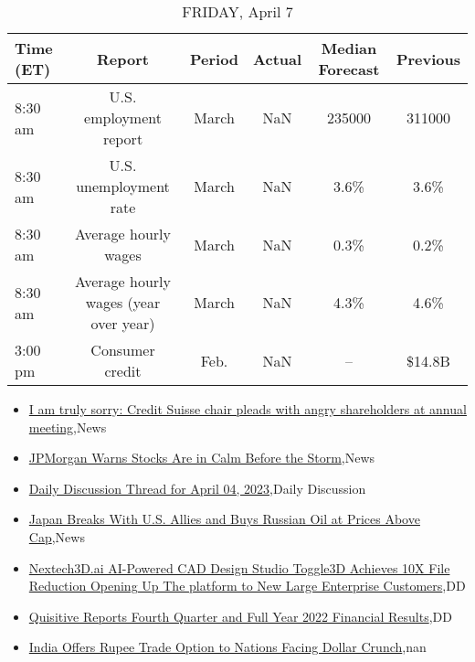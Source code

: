 \documentclass{article}%
\begin{document}
\begin{table}[htbp]%
\caption{FRIDAY, April 7}%
\centering%
\begin{adjustbox}{width=1\textwidth}%
\begin{tabular}{lccccc}
\toprule
Time (ET) &                                Report & Period & Actual & Median Forecast & Previous \\
\midrule
  8:30 am &                U.S. employment report &  March &    NaN &          235000 &   311000 \\
  8:30 am &                U.S. unemployment rate &  March &    NaN &            3.6\% &     3.6\% \\
  8:30 am &                  Average hourly wages &  March &    NaN &            0.3\% &     0.2\% \\
  8:30 am & Average hourly wages (year over year) &  March &    NaN &            4.3\% &     4.6\% \\
  3:00 pm &                       Consumer credit &   Feb. &    NaN &              -- &   \$14.8B \\
\bottomrule
\end{tabular}
%
\end{adjustbox}%
\end{table}

%
\begin{itemize}%
\item%
\href{https://reddit.com/r/wallstreetbets/comments/12bg1k6/i\_am\_truly\_sorry\_credit\_suisse\_chair\_pleads\_with/}{I am truly sorry: Credit Suisse chair pleads with angry shareholders at annual meeting},News%
\item%
\href{https://reddit.com/r/wallstreetbets/comments/12bfk59/jpmorgan\_warns\_stocks\_are\_in\_calm\_before\_the\_storm/}{JPMorgan Warns Stocks Are in Calm Before the Storm},News%
\item%
\href{https://reddit.com/r/wallstreetbets/comments/12be7jw/daily\_discussion\_thread\_for\_april\_04\_2023/}{Daily Discussion Thread for April 04, 2023},Daily Discussion%
\item%
\href{https://reddit.com/r/wallstreetbets/comments/12bddgr/japan\_breaks\_with\_us\_allies\_and\_buys\_russian\_oil/}{Japan Breaks With U.S. Allies and Buys Russian Oil at Prices Above Cap},News%
\item%
\href{https://reddit.com/r/Baystreetbets/comments/12bh8zt/nextech3dai\_aipowered\_cad\_design\_studio\_toggle3d/}{Nextech3D.ai AI-Powered CAD Design Studio Toggle3D Achieves 10X File Reduction Opening Up The platform to New Large Enterprise Customers},DD%
\item%
\href{https://reddit.com/r/Baystreetbets/comments/12axdgf/quisitive\_reports\_fourth\_quarter\_and\_full\_year/}{Quisitive Reports Fourth Quarter and Full Year 2022 Financial Results},DD%
\item%
\href{https://reddit.com/r/Economics/comments/12b73c2/india\_offers\_rupee\_trade\_option\_to\_nations\_facing/}{India Offers Rupee Trade Option to Nations Facing Dollar Crunch},nan%
\end{itemize}%
\end{document}
